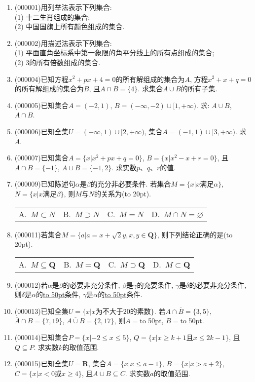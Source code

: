 \documentclass[10pt,a4paper]{article}
\newcommand{\blank}[1]{\underline{\hbox to #1pt{}}}
\newcommand{\bracket}[1]{(\hbox to #1pt{})}
\newcommand{\fourch}[4]{\par\begin{tabular}{p{.23\textwidth}p{.23\textwidth}p{.23\textwidth}p{.23\textwidth}}
A.~#1 &B.~#2& C.~#3& D.~#4
\end{tabular}}
\begin{document}
\begin{enumerate}[1.]

\item {\tiny (000001)}用列举法表示下列集合:\\
(1) 十二生肖组成的集合;\\
(2) 中国国旗上所有颜色组成的集合.
\item {\tiny (000002)}用描述法表示下列集合:\\
(1) 平面直角坐标系中第一象限的角平分线上的所有点组成的集合;\\
(2) $3$的所有倍数组成的集合.
\item {\tiny (000004)}已知方程$x^2+px+4=0$的所有解组成的集合为$A$, 方程$x^2+x+q=0$的所有解组成的集合为$B$, 且$A\cap B=\{4\}$. 求集合$A\cup B$的所有子集.
\item {\tiny (000005)}已知集合$A=(-2, 1)$, $B=(-\infty, -2)\cup [1, +\infty)$. 求: $A\cup B$, $A\cap B$.
\item {\tiny (000006)}已知全集$U=(-\infty, 1)\cup [2, +\infty)$, 集合$A=(-1, 1)\cup [3, +\infty)$. 求$\overline{A}$.
\item {\tiny (000007)}已知集合$A=\{x|x^2+px+q=0\}$, $B=\{x|x^2-x+r=0\}$, 且$A\cap B=\{-1\}$, $A\cup B=\{-1, 2\}$. 求实数$p$、$q$、$r$的值.
\item {\tiny (000009)}已知陈述句$\alpha$是$\beta$的充分非必要条件. 若集合$M=\{x|x\text{满足}\alpha\}$, $N=\{x|x\text{满足}\beta\}$, 则$M$与$N$的关系为\bracket{20}.
\fourch{$M\subset N$}{$M\supset N$}{$M=N$}{$M\cap N=\varnothing$}
\item {\tiny (000011)}若集合$M=\{a|a=x+\sqrt2y, x,y\in \mathbf{Q}\}$, 则下列结论正确的是\bracket{20}.
\fourch{$M\subseteq \mathbf{Q}$}{$M=\mathbf{Q}$}{$M\supset \mathbf{Q}$}{$M\subset \mathbf{Q}$}
\item {\tiny (000012)}若$\alpha$是$\beta$的必要非充分条件, $\beta$是$\gamma$的充要条件, $\gamma$是$\delta$的必要非充分条件, 则$\delta$是$\alpha$的\blank{50}条件, $\gamma$是$\alpha$的\blank{50}条件.
\item {\tiny (000013)}已知全集$U=\{x|x\text{为不大于}20\text{的素数}\}$. 若$A\cap \overline{B}=\{3, 5\}$, $\overline{A}\cap B=\{7, 19\}$, $\overline{A\cup B}=\{2, 17\}$, 则$A=$\blank{50}, $B=$\blank{50}.
\item {\tiny (000014)}已知集合$P=\{x|-2\le x\le 5\}$, $Q=\{x|x\ge k+1\text{且}x\le 2k-1\}$, 且$Q\subseteq P$. 求实数$k$的取值范围.
\item {\tiny (000015)}已知全集$U=\mathbf{R}$, 集合$A=\{x|x\le a-1\}$, $B=\{x|x>a+2\}$, $C=\{x|x<0\text{或}x\ge 4\}$, 且$\overline{A\cup B}\subseteq C$. 求实数$a$的取值范围.

\end{enumerate}
\end{document}

